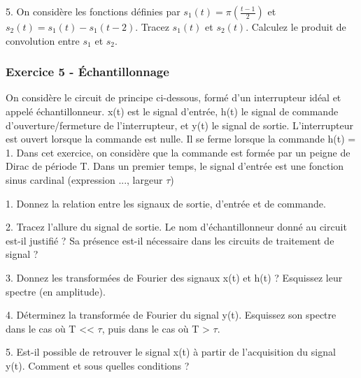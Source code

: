 	5. On considère les fonctions définies par $s_{1}(t)=\pi(\frac{t-1}{2})$ et $s_{2}(t)=s_{1}(t)-s_{1}(t-2)$. Tracez $s_{1}(t)$ et $s_{2}(t)$. Calculez le produit de convolution entre $s_{1}$ et $s_{2}$.
	
	\vspace{1\baselineskip}
	
	\subsubsection{Exercice 5 - Échantillonnage}
	
	On considère le circuit de principe ci-dessous, formé d'un interrupteur idéal et appelé échantillonneur. x(t) est le signal d'entrée, h(t) le signal de commande d'ouverture/fermeture de l'interrupteur, et y(t) le signal de sortie. L'interrupteur est ouvert lorsque la commande est nulle. Il se ferme lorsque la commande h(t) = 1.
	Dans cet exercice, on considère que la commande est formée par un peigne de Dirac de période T. Dans un premier temps, le signal d'entrée est une fonction sinus cardinal (expression ..., largeur $\tau$)
	
	1. Donnez la relation entre les signaux de sortie, d'entrée et de commande.
	
	2. Tracez l'allure du signal de sortie. Le nom d'échantillonneur donné au circuit est-il justifié ? Sa présence est-il nécessaire dans les circuits de traitement de signal ?
	
	3. Donnez les transformées de Fourier des signaux x(t) et h(t) ? Esquissez leur spectre (en amplitude).
	
	4. Déterminez la transformée de Fourier du signal y(t). Esquissez son spectre dans le cas où T << $\tau$, puis dans le cas où T > $\tau$.
	
	5. Est-il possible de retrouver le signal x(t) à partir de l'acquisition du signal y(t). Comment et sous quelles conditions ?
	
	
	
	
	
	